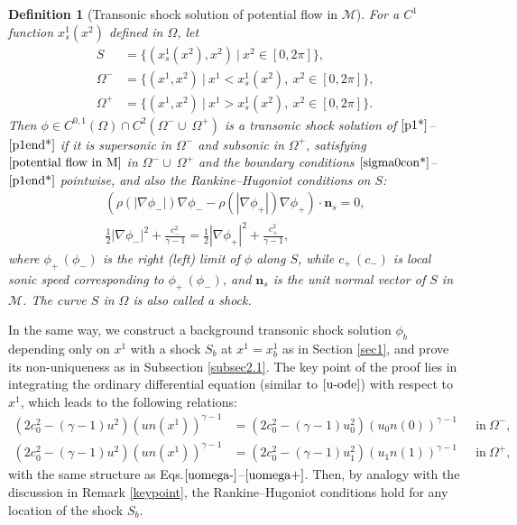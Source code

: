 \documentclass[reqno,12pt]{amsart}
\newtheorem{definition}{Definition}[section]
\numberwithin{equation}{section}
\begin{document}
	\begin{definition}[Transonic shock solution of potential flow in $\mathcal{M}$]\label{tss*}
		For a $C^1$ function $x^1_s(x^2)$ defined in $\Omega$, let		
		\begin{align*}
			S&=\{(x^1_s(x^2),x^2)~|~x^2\in[0,2\pi]\},\\
			\Omega^-&=\{(x^1,x^2)~|~x^1<x^1_s(x^2),~x^2\in[0,2\pi]\},\\
			\Omega^+&=\{(x^1,x^2)~|~x^1>x^1_s(x^2),~x^2\in[0,2\pi]\}.
		\end{align*}
		Then $\phi\in C^{0,1}(\Omega) \cap C^2(\Omega^-\cup~\Omega^+)$ is a transonic shock solution of $\eqref{p1*}$--$\eqref{p1end*}$ if it is supersonic in $\Omega^-$
		and subsonic in $\Omega^+$, satisfying $\eqref{potential flow in M}$ in $\Omega^-\cup~\Omega^+$ and the boundary conditions $\eqref{sigma0con*}$--$\eqref{p1end*}$ pointwise, and also the Rankine–Hugoniot conditions on $S$:
		\begin{align}
			(\rho(|\nabla \phi_-|)\nabla \phi_--\rho(|\nabla \phi_+|)\nabla \phi_+)\cdot \mathbf{n}_s=0,\label{rh1M}\\
			\frac{1}{2}|\nabla \phi_-|^2+\frac{c^2_-}{\gamma-1}=\frac{1}{2}|\nabla \phi_+|^2+\frac{c^2_+}{\gamma-1},\label{rh2M}
		\end{align}
		where $\phi_+\,(\phi_-)$ is the right (left) limit of $\phi$ along $S$, while $c_+\, (c_-)$ is local sonic speed corresponding to  $\phi_+\, (\phi_-)$, and $\mathbf{n}_s$ is the unit  normal vector of $S$ in $\mathcal{M}$. The curve $S$ in $\Omega$ is also called a shock.
	\end{definition}
	
	In the same way, we construct a background transonic shock solution $\phi_b$ depending only on $x^1$ with a shock $S_b$ at $x^1=x^1_b$ as in Section \ref{sec1}, and prove its non-uniqueness as in Subsection \ref{subsec2.1}. The key point of the proof lies in integrating the ordinary differential equation (similar to $\eqref{u-ode}$) with respect to $x^1$, which leads to the following relations:
	\begin{align}
		(2c^2_0-(\gamma-1)u^2)(un(x^1))^{\gamma-1}&=(2c^2_0-(\gamma-1)u^2_0)(u_0n(0))^{\gamma-1}~~\quad \text{in}~\Omega^-,\label{uomega-*}\\
		(2c^2_0-(\gamma-1)u^2)(un(x^1))^{\gamma-1}&=(2c^2_0-(\gamma-1)u^2_1)(u_1n(1))^{\gamma-1}~~\quad \text{in}~\Omega^+,\label{uomega+*}
	\end{align} 
	with the same structure as Eqs.$\eqref{uomega-}$--$\eqref{uomega+}$. Then, by analogy with the discussion in Remark \ref{keypoint}, the Rankine–Hugoniot conditions hold for any location of the shock $S_b$. 
	
\end{document}
